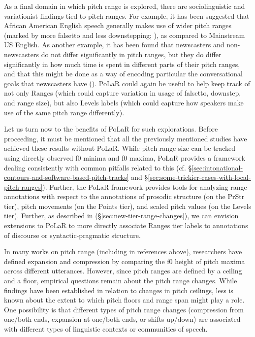 As a final domain in which pitch range is explored, there are sociolinguistic and variationist findings tied to pitch ranges. For example, it has been suggested that African American English speech generally makes use of wider pitch ranges (marked by more falsetto and less downstepping; \citealt{wolfram-02, thomas07}), as compared to Mainstream US English. As another example, it has been found that newscasters and non-newscasters do not differ significantly in pitch ranges, but they do differ significantly in how much time is spent in different parts of their pitch ranges, and that this might be done as a way of encoding particular the conversational goals that newscasters have (\citealt{gasser-19}). PoLaR could again be useful to help keep track of not only Ranges (which could capture variation in usage of falsetto, downstep, and range size), but also Levels labels (which could capture how speakers make use of the same pitch range differently).

Let us turn now to the benefits of PoLaR for such explorations. Before proceeding, it must be mentioned that all the previously mentioned studies have achieved these results without PoLaR. While pitch range size can be tracked using directly observed f0 minima and f0 maxima, PoLaR provides a framework  dealing consistently with common pitfalls related to this (cf. §\ref{sec:intonational-contours-and-software-based-pitch-tracks} and §\ref{sec:some-trickier-cases-with-local-pitch-ranges}). Further, the PoLaR framework provides tools for analyzing range annotations with respect to the annotations of prosodic structure (on the PrStr tier), pitch movements (on the Points tier), and scaled pitch values (on the Levels tier). Further, as described in (§\ref{sec:new-tier-range-changes}), we can envision extensions to PoLaR to more directly associate Ranges tier labels to annotations of discourse or syntactic-pragmatic structure. 
%
\newline

In many works on pitch range (including in references above), researchers have defined expansion and compression by comparing the f0 height of pitch maxima across different utterances. However, since pitch ranges are defined by a ceiling and a floor, empirical questions remain about the pitch range changes. While findings have been established in relation to changes in pitch ceilings, less is known about the extent to which pitch floors and range span might play a role. One possibility is that different types of pitch range changes (compression from one\slash both ends, expansion at one\slash both ends, or shifts up\slash down) are associated with different types of linguistic contexts or communities of speech.

